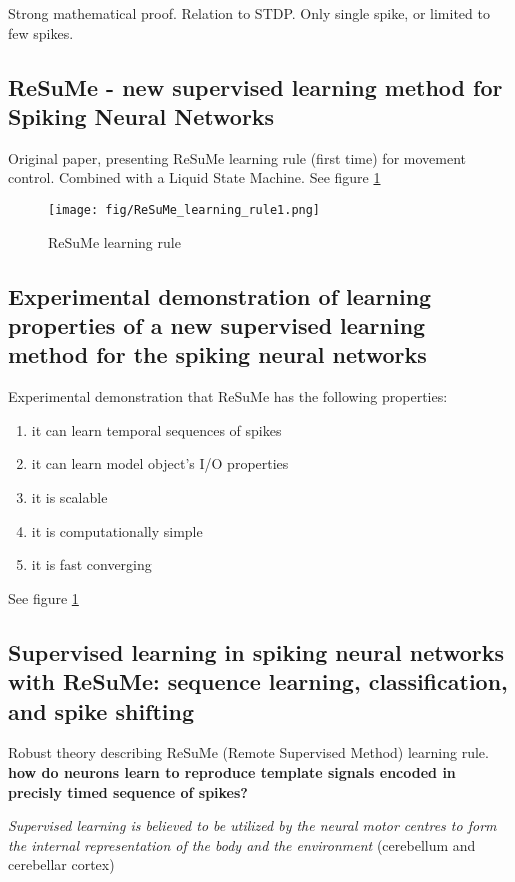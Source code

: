\documentclass[12pt]{article}
\begin{document}
Strong mathematical proof. Relation to STDP. Only single spike, or limited to few spikes.

\subsection{ReSuMe - new supervised learning method for Spiking Neural Networks \cite{ponulak2005resume}}
Original paper, presenting ReSuMe learning rule (first time) for movement control. Combined with a Liquid State Machine. See figure \ref{ReSuMe1}

\begin{figure}
\center
\texttt{[image: fig/ReSuMe\_learning\_rule1.png]}
\caption{ReSuMe learning rule}
\label{ReSuMe1}
\end{figure}

\subsection{Experimental demonstration of learning properties of a new supervised learning method for the spiking neural networks \cite{kasinski2005experimental}}

Experimental demonstration that ReSuMe has the following properties: \begin{enumerate}
\item it can learn temporal sequences of spikes
\item it can learn model object's I/O properties
\item it is scalable
\item it is computationally simple
\item it is fast converging
\end{enumerate}

See figure \ref{ReSuMe1}

\subsection{Supervised learning in spiking neural networks with ReSuMe: sequence learning, classification, and spike shifting \cite{ponulak2010supervised}}

Robust theory describing ReSuMe (Remote Supervised Method) learning rule.
\textbf{how do neurons learn to reproduce template signals encoded in precisly timed sequence of spikes?}

\textit{Supervised learning is believed to be utilized by the neural motor centres to form the internal representation of the body and the environment} (cerebellum and cerebellar cortex)
\end{document}
